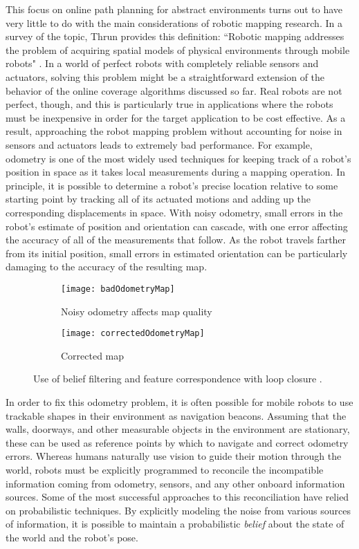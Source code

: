 This focus on online path planning for abstract environments turns out to have very little to do with the main considerations of robotic mapping research. In a survey of the topic, Thrun provides this definition: ``Robotic mapping addresses the problem of acquiring spatial models of physical environments through mobile robots" \cite{Thrun}. In a world of perfect robots with completely reliable sensors and actuators, solving this problem might be a straightforward extension of the behavior of the online coverage algorithms discussed so far. Real robots are not perfect, though, and this is particularly true in applications where the robots must be inexpensive in order for the target application to be cost effective. As a result, approaching the robot mapping problem without accounting for noise in sensors and actuators leads to extremely bad performance. For example, odometry is one of the most widely used techniques for keeping track of a robot's position in space as it takes local measurements during a mapping operation. In principle, it is possible to determine a robot's precise location relative to some starting point by tracking all of its actuated motions and adding up the corresponding displacements in space. With noisy odometry, small errors in the robot's estimate of position and orientation can cascade, with one error affecting the accuracy of all of the measurements that follow. As the robot travels farther from its initial position, small errors in estimated orientation can be particularly damaging to the accuracy of the resulting map.

\begin{figure}[H]
\begin{subfigure}{.5\textwidth}
  \centering
  \texttt{[image: badOdometryMap]}
  \caption{Noisy odometry affects map quality}
\end{subfigure}
\begin{subfigure}{.5\textwidth}
  \centering
  \texttt{[image: correctedOdometryMap]}
  \caption{Corrected map}
\end{subfigure}
\caption[Odometry Errors and Corrected Map]{Use of belief filtering and feature correspondence with loop closure \cite{Thrun}.}
\end{figure}

In order to fix this odometry problem, it is often possible for mobile robots to use trackable shapes in their environment as navigation beacons. Assuming that the walls, doorways, and other measurable objects in the environment are stationary, these can be used as reference points by which to navigate and correct odometry errors. Whereas humans naturally use vision to guide their motion through the world, robots must be explicitly programmed to reconcile the incompatible information coming from odometry, sensors, and any other onboard information sources. Some of the most successful approaches to this reconciliation have relied on probabilistic techniques. By explicitly modeling the noise from various sources of information, it is possible to maintain a probabilistic \textit{belief} about the state of the world and the robot's pose.

